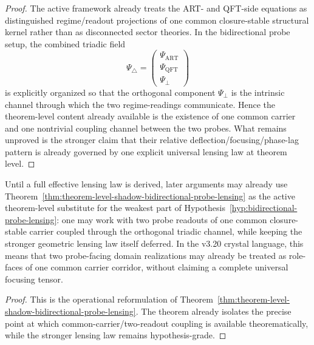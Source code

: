 \begin{proof}
The active framework already treats the ART- and QFT-side equations as distinguished regime/readout projections of one common closure-stable structural kernel rather than as disconnected sector theories. In the bidirectional probe setup, the combined triadic field
\[
  \Psi_{\triangle}
  =
  \begin{pmatrix}
    \Psi_{\mathrm{ART}}\\
    \Psi_{\mathrm{QFT}}\\
    \Psi_\perp
  \end{pmatrix}
\]
is explicitly organized so that the orthogonal component $\Psi_\perp$ is the intrinsic channel through which the two regime-readings communicate. Hence the theorem-level content already available is the existence of one common carrier and one nontrivial coupling channel between the two probes. What remains unproved is the stronger claim that their relative deflection/focusing/phase-lag pattern is already governed by one explicit universal lensing law at theorem level.
\end{proof}

\begin{corollary}
\label{cor:operational-reading-bidirectional-probe-lensing-v320}
Until a full effective lensing law is derived, later arguments may already use Theorem~\ref{thm:theorem-level-shadow-bidirectional-probe-lensing} as the active theorem-level substitute for the weakest part of Hypothesis~\ref{hyp:bidirectional-probe-lensing}: one may work with two probe readouts of one common closure-stable carrier coupled through the orthogonal triadic channel, while keeping the stronger geometric lensing law itself deferred. In the v3.20 crystal language, this means that two probe-facing domain realizations may already be treated as role-faces of one common carrier corridor, without claiming a complete universal focusing tensor.
\end{corollary}

\begin{proof}
This is the operational reformulation of Theorem~\ref{thm:theorem-level-shadow-bidirectional-probe-lensing}. The theorem already isolates the precise point at which common-carrier/two-readout coupling is available theorematically, while the stronger lensing law remains hypothesis-grade.
\end{proof}

